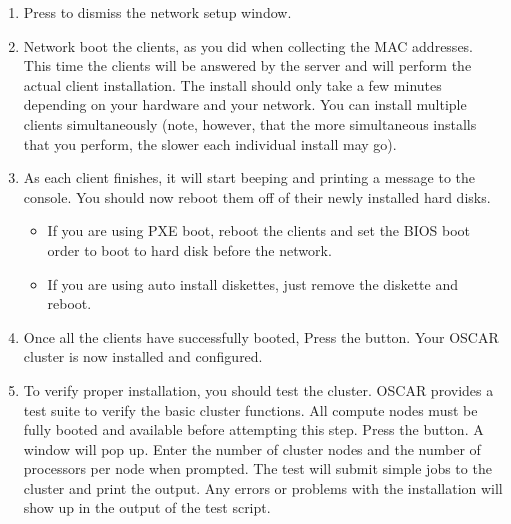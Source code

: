 \begin {enumerate}

\item Press  to dismiss the network setup window.
  
\item Network boot the clients, as you did when collecting the MAC
  addresses. This time the clients will be answered by the server and
  will perform the actual client installation. The install should only
  take a few minutes depending on your hardware and your network.  You
  can install multiple clients simultaneously (note, however, that the
  more simultaneous installs that you perform, the slower each
  individual install may go).

  
\item As each client finishes, it will start beeping and printing a
  message to the console. You should now reboot them off of their
  newly installed hard disks.

  \begin{itemize}
  \item If you are using PXE boot, reboot the clients and set the BIOS
    boot order to boot to hard disk before the network.
  \item If you are using auto install diskettes, just remove the
    diskette and reboot.
  \end{itemize}

  
\item Once all the clients have successfully booted, Press the
   button. Your OSCAR cluster is now
  installed and configured.

  
\item To verify proper installation, you should test the cluster.
  OSCAR provides a test suite to verify the basic cluster functions.
  All compute nodes must be fully booted and available before
  attempting this step.  Press the  button.
  A window will pop up.  Enter the number of cluster nodes and the
  number of processors per node when prompted. The test will submit
  simple jobs to the cluster and print the output. Any errors or
  problems with the installation will show up in the output of the
  test script.


\end{enumerate}
